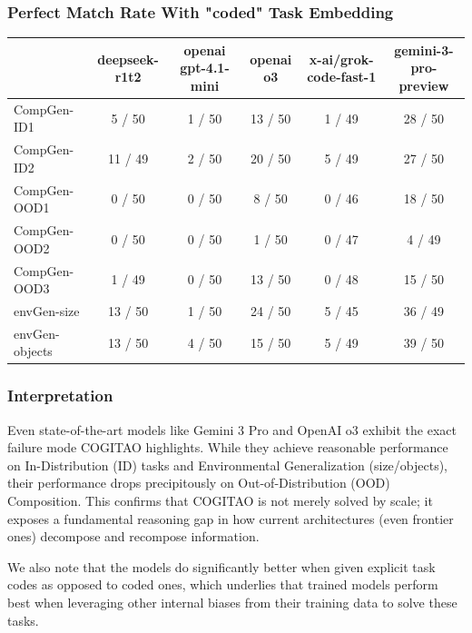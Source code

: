 \subsubsection{Perfect Match Rate With "coded" Task Embedding}

\begin{table}[h!]
\centering
\begin{tabular}{lccccc}
\hline
 & deepseek-r1t2 & openai gpt-4.1-mini & openai o3 & x-ai/grok-code-fast-1 & gemini-3-pro-preview \\
\hline
CompGen-ID1 & 5 / 50 & 1 / 50 & 13 / 50 & 1 / 49 & 28 / 50 \\
CompGen-ID2 & 11 / 49 & 2 / 50 & 20 / 50 & 5 / 49 & 27 / 50 \\
CompGen-OOD1 & 0 / 50 & 0 / 50 & 8 / 50 & 0 / 46 & 18 / 50 \\
CompGen-OOD2 & 0 / 50 & 0 / 50 & 1 / 50 & 0 / 47 & 4 / 49 \\
CompGen-OOD3 & 1 / 49 & 0 / 50 & 13 / 50 & 0 / 48 & 15 / 50 \\
envGen-size & 13 / 50 & 1 / 50 & 24 / 50 & 5 / 45 & 36 / 49 \\
envGen-objects & 13 / 50 & 4 / 50 & 15 / 50 & 5 / 49 & 39 / 50 \\
\hline
\end{tabular}
\end{table}

\subsubsection{Interpretation}

Even state-of-the-art models like Gemini 3 Pro and OpenAI o3 exhibit the exact failure mode COGITAO highlights. While they achieve reasonable performance on In-Distribution (ID) tasks and Environmental Generalization (size/objects), their performance drops precipitously on Out-of-Distribution (OOD) Composition. This confirms that COGITAO is not merely solved by scale; it exposes a fundamental reasoning gap in how current architectures (even frontier ones) decompose and recompose information. 

We also note that the models do significantly better when given explicit task codes as opposed to coded ones, which underlies that trained models perform best when leveraging other internal biases from their training data to solve these tasks. 

